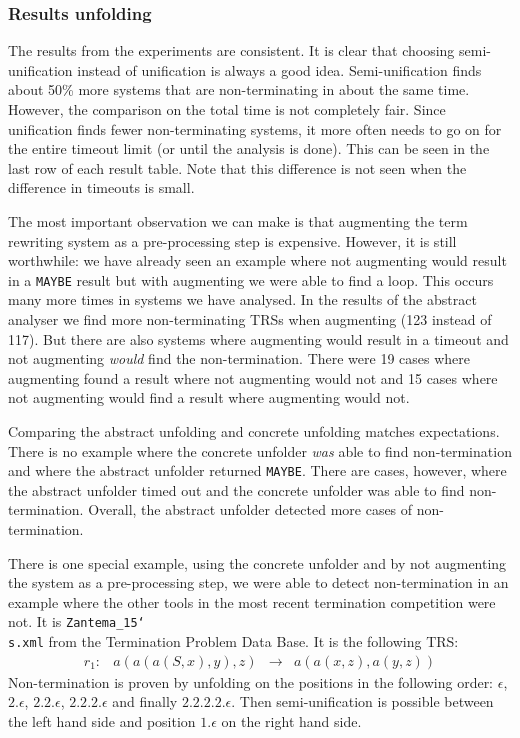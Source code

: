 \subsubsection{Results unfolding}
The results from the experiments are consistent. It is clear that choosing semi-unification instead of unification is always a good idea. Semi-unification finds about 50\% more systems that are non-terminating in about the same time. However, the comparison on the total time is not completely fair. Since unification finds fewer non-terminating systems, it more often needs to go on for the entire timeout limit (or until the analysis is done). This can be seen in the last row of each result table. Note that this difference is not seen when the difference in timeouts is small. 

The most important observation we can make is that augmenting the term rewriting system as a pre-processing step is expensive. However, it is still worthwhile: we have already seen an example where not augmenting would result in a \texttt{MAYBE} result but with augmenting we were able to find a loop. This occurs many more times in systems we have analysed. In the results of the abstract analyser we find more non-terminating TRSs when augmenting (123 instead of 117). But there are also systems where augmenting would result in a timeout and not augmenting \textit{would} find the non-termination. There were 19 cases where augmenting found a result where not augmenting would not and 15 cases where not augmenting would find a result where augmenting would not.

Comparing the abstract unfolding and concrete unfolding matches expectations. There is no example where the concrete unfolder \textit{was} able to find non-termination and where the abstract unfolder returned \texttt{MAYBE}. There are cases, however, where the abstract unfolder timed out and the concrete unfolder was able to find non-termination. Overall, the abstract unfolder detected more cases of non-termination. 

There is one special example, using the concrete unfolder and by not augmenting the system as a pre-processing step, we were able to detect non-termination in an example where the other tools in the most recent termination competition were not. It is \texttt{Zantema\_15\char`\\s.xml} from the Termination Problem Data Base. It is the following TRS:
\[
\begin{array}{lrcl}
    r_1: & a(a(a(S, x), y), z) & \rightarrow & a(a(x, z), a(y, z)) 
\end{array}
\]
Non-termination is proven by unfolding on the positions in the following order: $\epsilon$, $2.\epsilon$, $2.2.\epsilon$, $2.2.2.\epsilon$ and finally $2.2.2.2.\epsilon$. Then semi-unification is possible between the left hand side and position $1.\epsilon$ on the right hand side. 

